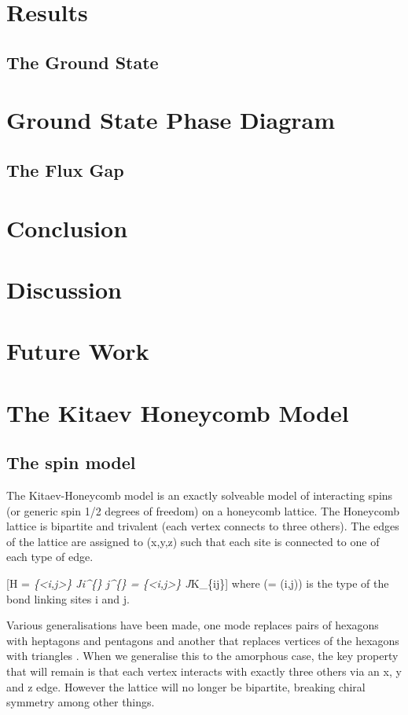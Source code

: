 \section{Results}
    \subsection{The Ground State}
    \section{Ground State Phase Diagram}
    \subsection{The Flux Gap}

\section{Conclusion}
\section{Discussion}
\section{Future Work}

\section{The Kitaev Honeycomb Model}

\subsection{The spin model}

The Kitaev-Honeycomb model is an exactly solveable model of interacting
spins (or generic spin 1/2 degrees of freedom) on a honeycomb lattice.
The Honeycomb lattice is bipartite and trivalent (each vertex connects
to three others). The edges of the lattice are assigned to (x,y,z) such
that each site is connected to one of each type of edge.

{[}H = \sum\emph{\{\textless i,j\textgreater\}
J}\alpha \sigma\emph{i\^{}\{\alpha\} \sigma\emph{j\^{}\{\alpha\} =
\sum}\{\textless i,j\textgreater\} J}\alpha K\_\{ij\}{]} where (\alpha =
\alpha(i,j)) is the type of the bond linking sites i and j.

Various generalisations have been made, one mode replaces pairs of
hexagons with heptagons and pentagons
\cite{periNonAbelianChiralSpin2020} and another that replaces vertices
of the hexagons with triangles \cite{yaoExactChiralSpin2007}. When we
generalise this to the amorphous case, the key property that will remain
is that each vertex interacts with exactly three others via an x, y and
z edge. However the lattice will no longer be bipartite, breaking chiral
symmetry among other things.

